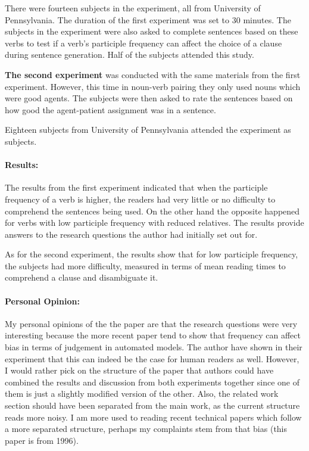 \documentclass[12pt]{report}
\begin{document}
There were fourteen subjects in the experiment, all from University of Pennsylvania. The duration of the first experiment was set to 30 minutes. The subjects in the experiment were also asked to complete sentences based on these verbs to test if a verb's participle frequency can affect the choice of a clause during sentence generation. Half of the subjects attended this study. 

\textbf{The second experiment}  was conducted with the same materials from the first experiment. However, this time in noun-verb pairing they only used nouns which were good agents. The subjects were then asked to rate the sentences based on how good the agent-patient assignment was in a sentence. 

Eighteen subjects from University of Pennsylvania attended the experiment as subjects.
\vfill

\paragraph{Results:} 
The results from the first experiment indicated that when the participle frequency of a verb is higher, the readers had very little or no difficulty to comprehend the sentences being used. On the other hand the opposite happened for verbs with low participle frequency with reduced relatives. The results provide answers to the research questions the author had initially  set out for. 

As for the second experiment, the results show that for low participle frequency, the subjects had more difficulty, measured in terms of mean reading times to comprehend a clause and disambiguate it.
\vfill

\paragraph{Personal Opinion:} 
My personal opinions of the the paper are that the research questions were very interesting because the more recent paper tend to show that frequency can affect bias in terms of judgement in automated models. The author have shown in their experiment that this can indeed be the case for human readers as well. However, I would rather pick on the structure of the paper that authors could have combined the results and discussion from both experiments together since one of them is just a slightly modified version of the other. Also, the related work section should have been separated from the main work, as the current structure reads more noisy. I am more used to reading recent technical papers which follow a more separated structure, perhaps my complaints stem from that bias (this paper is from 1996).
\vfill
\end{document}
